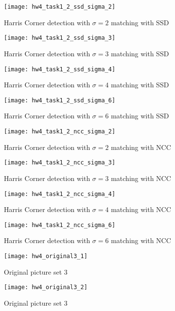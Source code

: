 \documentclass[11pt]{article}
\begin{document}
\begin{figure}[H]
\centering
\texttt{[image: hw4\_task1\_2\_ssd\_sigma\_2]}
\caption{Harris Corner detection with $\sigma = 2$ matching with SSD}
\label{}
\end{figure}
\begin{figure}[H]
\centering
\texttt{[image: hw4\_task1\_2\_ssd\_sigma\_3]}
\caption{Harris Corner detection with $\sigma = 3$ matching with SSD}
\label{}
\end{figure}
\begin{figure}[H]
\centering
\texttt{[image: hw4\_task1\_2\_ssd\_sigma\_4]}
\caption{Harris Corner detection with $\sigma = 4$ matching with SSD}
\label{}
\end{figure}
\begin{figure}[H]
\centering
\texttt{[image: hw4\_task1\_2\_ssd\_sigma\_6]}
\caption{Harris Corner detection with $\sigma = 6$ matching with SSD}
\label{}
\end{figure}

\begin{figure}[H]
\centering
\texttt{[image: hw4\_task1\_2\_ncc\_sigma\_2]}
\caption{Harris Corner detection with $\sigma = 2$ matching with NCC}
\label{}
\end{figure}
\begin{figure}[H]
\centering
\texttt{[image: hw4\_task1\_2\_ncc\_sigma\_3]}
\caption{Harris Corner detection with $\sigma = 3$ matching with NCC}
\label{}
\end{figure}
\begin{figure}[H]
\centering
\texttt{[image: hw4\_task1\_2\_ncc\_sigma\_4]}
\caption{Harris Corner detection with $\sigma = 4$ matching with NCC}
\label{}
\end{figure}
\begin{figure}[H]
\centering
\texttt{[image: hw4\_task1\_2\_ncc\_sigma\_6]}
\caption{Harris Corner detection with $\sigma = 6$ matching with NCC}
\label{}
\end{figure}


\begin{figure}[H]
\centering
\texttt{[image: hw4\_original3\_1]}
\caption{Original picture set 3}
\label{}
\end{figure}
\begin{figure}[H]
\centering
\texttt{[image: hw4\_original3\_2]}
\caption{Original picture set 3}
\label{}
\end{figure}
\end{document}
